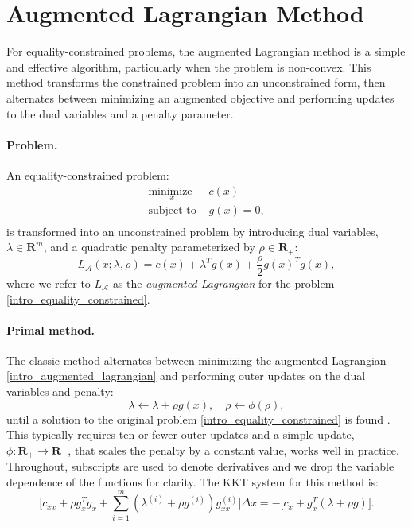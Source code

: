 \section{Augmented Lagrangian Method}
For equality-constrained problems, the augmented Lagrangian method \cite{bertsekas2014constrained} is a simple and effective algorithm, particularly when the problem is non-convex. This method transforms the constrained problem into an unconstrained form, then alternates between minimizing an augmented objective and performing updates to the dual variables and a penalty parameter.

\paragraph{Problem.}
An equality-constrained problem:
\begin{equation}
	\begin{array}{ll}
		\underset{x}{\mbox{minimize }}  & c(x) \\
		\mbox{subject to } & g(x) = 0, \\
	\end{array}
	\label{intro_equality_constrained}
\end{equation}
is transformed into an unconstrained problem by introducing dual variables, $\lambda \in \mathbf{R}^m$, and a quadratic penalty parameterized by $\rho \in \mathbf{R}_+$:
\begin{equation}
	L_{\mathcal{A}}(x; \lambda, \rho) = c(x) + \lambda^T g(x) + \frac{\rho}{2} g(x)^T g(x), 
	\label{intro_augmented_lagrangian}
\end{equation}
where we refer to $L_{\mathcal{A}}$ as the \emph{augmented Lagrangian} for the problem \eqref{intro_equality_constrained}.

\paragraph{Primal method.}
The classic method alternates between minimizing the augmented Lagrangian  \eqref{intro_augmented_lagrangian} and performing outer updates on the dual variables and penalty:
\begin{equation} 
	\lambda \leftarrow \lambda + \rho g(x), \quad \rho \leftarrow \phi (\rho), \label{intro_augmented_lagrangian_update}
\end{equation}
until a solution to the original problem \eqref{intro_equality_constrained} is found \cite{bertsekas2014constrained}. This typically requires ten or fewer outer updates and a simple update, $\phi : \mathbf{R}_+ \rightarrow \mathbf{R}_+$, that scales the penalty by a constant value, works well in practice.
Throughout, subscripts are used to denote derivatives and we drop the variable dependence of the functions for clarity. The KKT system for this method is:
\begin{equation} 
	\Big[c_{xx} + \rho g_x^T g_x + \sum \limits_{i = 1}^m (\lambda^{(i)} + \rho g^{(i)}) g_{xx}^{(i)} \Big] \Delta x = -\Big[c_x + g_x^T (\lambda + \rho g)\Big]. \label{intro_augmented_lagrangian_update} 
\end{equation}

